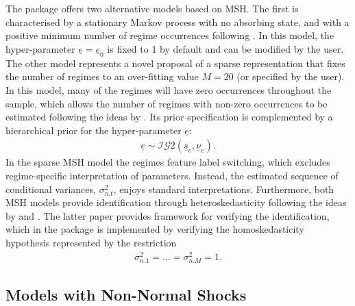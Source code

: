 \documentclass[
  nojss]{jss}
\begin{document}
The package  offers two alternative models based on MSH. The
first is characterised by a stationary Markov process with no absorbing
state, and with a positive minimum number of regime occurrences
following \cite{Wozniak2015}. In this model, the hyper-parameter
\(\underline{e} = \underline{e}_0\) is fixed to 1 by default and can be
modified by the user. The other model represents a novel proposal of a
sparse representation that fixes the number of regimes to an
over-fitting value \(M=20\) (or specified by the user). In this model,
many of the regimes will have zero occurrences throughout the sample,
which allows the number of regimes with non-zero occurrences to be
estimated following the ideas by \cite{malsiner2016model}. Its prior
specification is complemented by a hierarchical prior for the
hyper-parameter \(\underline{e}\): \begin{align}
\underline{e} \sim \mathcal{IG}2\left(\underline{s}_e, \underline{\nu}_e\right). \label{eq:sparseprior}
\end{align} In the sparse MSH model the regimes feature label switching,
which excludes regime-specific interpretation of parameters. Instead,
the estimated sequence of conditional variances, \(\sigma_{n.t}^2\),
enjoys standard interpretations. Furthermore, both MSH models provide
identification through heteroskedasticity following the ideas by
\cite{LLM2010} and \cite{LW2017}. The latter paper provides framework
for verifying the identification, which in the  package is
implemented by verifying the homoskedasticity hypothesis represented by
the restriction \begin{align}
\sigma_{n.1}^2 = \dots = \sigma_{n.M}^2 = 1.\label{eq:homonorm}
\end{align}

\subsection{Models with Non-Normal Shocks}
\end{document}
